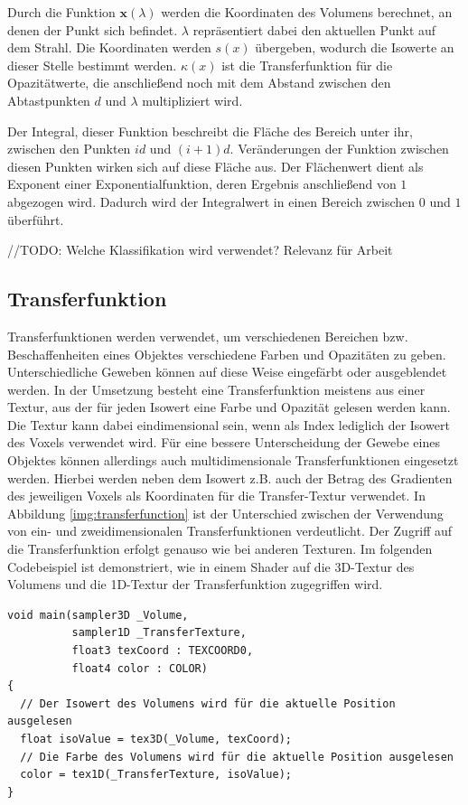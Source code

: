 Durch die Funktion  $\mathbf{x}(\lambda)$ werden die Koordinaten des Volumens berechnet, an denen der Punkt sich befindet. $\lambda$ repräsentiert dabei den aktuellen Punkt auf dem Strahl. 
Die Koordinaten werden $s(x)$ übergeben, wodurch die Isowerte an dieser Stelle bestimmt werden. $\kappa(x)$ ist die Transferfunktion für die Opazitätwerte, die anschließend noch mit dem Abstand zwischen den Abtastpunkten $d$ und $\lambda$ multipliziert wird.

Der Integral, dieser Funktion beschreibt die Fläche des Bereich unter ihr, zwischen den Punkten $id$ und $(i+1)d$. Veränderungen der Funktion zwischen diesen Punkten wirken sich auf diese Fläche aus. 
Der Flächenwert dient als Exponent einer Exponentialfunktion, deren Ergebnis anschließend von $1$ abgezogen wird. Dadurch wird der Integralwert in einen Bereich zwischen $0$ und $1$ überführt. 

\citet{Hadwiger06}

//TODO:
Welche Klassifikation wird verwendet? Relevanz für Arbeit

\subsection{Transferfunktion}

Transferfunktionen werden verwendet, um verschiedenen Bereichen bzw. Beschaffenheiten eines Objektes verschiedene Farben und Opazitäten zu geben. Unterschiedliche Geweben können auf diese Weise eingefärbt oder ausgeblendet werden. In der Umsetzung besteht eine Transferfunktion meistens aus einer Textur, aus der für jeden Isowert eine Farbe und Opazität gelesen werden kann. Die Textur kann dabei eindimensional sein, wenn als Index lediglich der Isowert des Voxels verwendet wird. Für eine bessere Unterscheidung der Gewebe eines Objektes können allerdings auch multidimensionale Transferfunktionen eingesetzt werden. Hierbei werden neben dem Isowert z.B. auch der Betrag des Gradienten des jeweiligen Voxels als Koordinaten für die Transfer-Textur verwendet. In Abbildung \ref{img:transferfunction} ist der Unterschied zwischen der Verwendung von ein- und zweidimensionalen Transferfunktionen verdeutlicht. Der Zugriff auf die Transferfunktion erfolgt genauso wie bei anderen Texturen. Im folgenden Codebeispiel ist demonstriert, wie in einem Shader auf die 3D-Textur des Volumens und die 1D-Textur der Transferfunktion zugegriffen wird. \citet{Fernando04}

\begin{verbatim}
void main(sampler3D _Volume,
          sampler1D _TransferTexture,
          float3 texCoord : TEXCOORD0,
          float4 color : COLOR)
{
  // Der Isowert des Volumens wird für die aktuelle Position ausgelesen
  float isoValue = tex3D(_Volume, texCoord);
  // Die Farbe des Volumens wird für die aktuelle Position ausgelesen
  color = tex1D(_TransferTexture, isoValue);
}
\end{verbatim}

